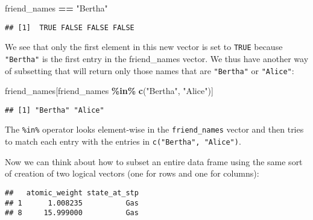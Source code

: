 \documentclass[]{tufte-book}
\newenvironment{Shaded}{\begin{snugshade}}{\end{snugshade}}
\newcommand{\KeywordTok}[1]{\textcolor[rgb]{0.13,0.29,0.53}{\textbf{#1}}}
\newcommand{\NormalTok}[1]{#1}
\newcommand{\OperatorTok}[1]{\textcolor[rgb]{0.81,0.36,0.00}{\textbf{#1}}}
\newcommand{\StringTok}[1]{\textcolor[rgb]{0.31,0.60,0.02}{#1}}
\begin{document}
\begin{Shaded}
\begin{Highlighting}[]
\NormalTok{friend\_names }\OperatorTok{==}\StringTok{ "Bertha"}
\end{Highlighting}
\end{Shaded}

\begin{verbatim}
## [1]  TRUE FALSE FALSE FALSE
\end{verbatim}

We see that only the first element in this new vector is set to \texttt{TRUE} because \texttt{"Bertha"} is the first entry in the friend\_names vector. We thus have another way of subsetting that will return only those names that are \texttt{"Bertha"} or \texttt{"Alice"}:

\begin{Shaded}
\begin{Highlighting}[]
\NormalTok{friend\_names[friend\_names }\OperatorTok{\%in\%}\StringTok{ }\KeywordTok{c}\NormalTok{(}\StringTok{"Bertha"}\NormalTok{, }\StringTok{"Alice"}\NormalTok{)]}
\end{Highlighting}
\end{Shaded}

\begin{verbatim}
## [1] "Bertha" "Alice"
\end{verbatim}

The \texttt{\%in\%} operator looks element-wise in the \texttt{friend\_names} vector and then tries to match each entry with the entries in \texttt{c("Bertha",\ "Alice")}.

Now we can think about how to subset an entire data frame using the same sort of creation of two logical vectors (one for rows and one for columns):

\begin{Shaded}
\end{Shaded}

\begin{verbatim}
##   atomic_weight state_at_stp
## 1      1.008235          Gas
## 8     15.999000          Gas
\end{verbatim}
\end{document}
